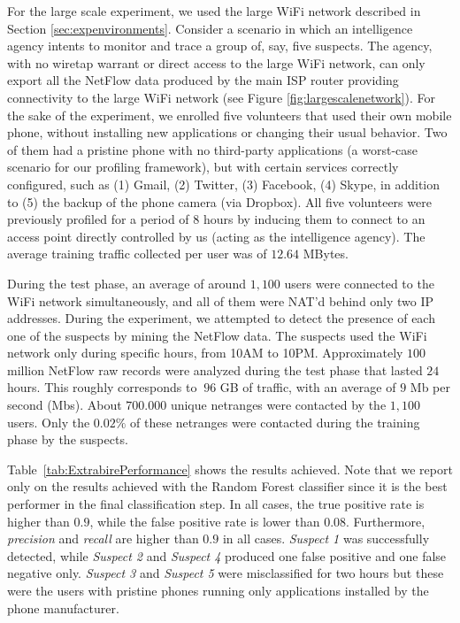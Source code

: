 \documentclass[10pt,conference,compsocconf,letterpaper]{IEEEtran}
\begin{document}
For the large scale experiment, we used the large WiFi network described in Section \ref{sec:expenvironments}. 
Consider a scenario in which an intelligence agency intents to monitor and trace 
a group of, say, five suspects. The agency, with no wiretap warrant or direct access 
to the large WiFi network, can only export all the NetFlow data produced by the main ISP router providing connectivity to the large WiFi network (see Figure \ref{fig:largescalenetwork}).
For the sake of the experiment, we enrolled five volunteers that used their own mobile phone, without installing new applications or changing their usual behavior. Two of them had a pristine phone with no third-party applications (a worst-case scenario for our profiling framework), but with certain services correctly configured, such as (1) Gmail, (2) Twitter,
(3) Facebook, (4) Skype, in addition to (5) the backup of the phone camera (via Dropbox). 
All five volunteers were previously profiled for a period of $8$ hours by inducing them to connect to an access point directly controlled by us (acting as the intelligence agency). The average training traffic collected per user was of $12.64$ MBytes.

During the test phase, an average of around $1{,}100$ users were connected to the WiFi network simultaneously, and all of them 
were NAT'd behind only two IP addresses. During the experiment, we attempted to detect the presence of each one of the suspects by mining the NetFlow data. The suspects used the WiFi network only during specific hours, from 10AM to 10PM.
Approximately $100$ million NetFlow raw records were analyzed during the test phase that lasted $24$ hours. This roughly corresponds to $~96$ GB of traffic, with an average of $9$ Mb per second (Mbs). 
About $700.000$ unique netranges were contacted by the $1{,}100$ users. Only the $0.02\%$ of these netranges were contacted during the training phase by the suspects.


Table~\ref{tab:ExtrabirePerformance} shows the results achieved. Note that we report only on the results 
achieved with the Random Forest classifier since it is the best performer in the final classification step. 
In all cases, the true positive rate is higher than $0.9$, while the false positive rate is lower than $0.08$. Furthermore, {\em precision} and {\em recall} are higher than $0.9$ in all cases. 
\textit{Suspect 1} was successfully detected, while \textit{Suspect 2} and \textit{Suspect 4} produced one false positive and one false negative only. 
\textit{Suspect 3} and \textit{Suspect 5} were misclassified for two hours but these were the users with pristine phones running only applications installed by the phone manufacturer.
\end{document}
